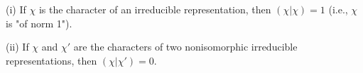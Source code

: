 (i) If $\chi$ is the character of an irreducible representation, then $(\chi|\chi) = 1$ (i.e., $\chi$ is "of norm 1").

(ii) If $\chi$ and $\chi'$ are the characters of two nonisomorphic irreducible representations, then $(\chi|\chi') = 0$.
